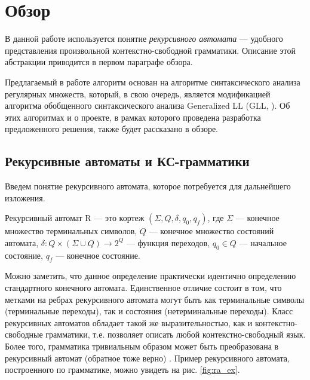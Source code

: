 \section{Обзор}

В данной работе используется понятие \textit{рекурсивного автомата} \cite{tellier2006ra} --- удобного представления произвольной контекстно-свободной грамматики.
Описание этой абстракции приводится в первом параграфе обзора.

Предлагаемый в работе алгоритм основан на алгоритме синтаксического анализа регулярных множеств, который, в свою очередь, является модификацией алгоритма обобщенного синтаксического анализа \linebreak Generalized LL (GLL, \cite{gll}).
Об этих алгоритмах и о проекте, в рамках которого проведена разработка предложенного решения, также будет рассказано в обзоре.

\subsection{Рекурсивные автоматы и КС-грамматики}
Введем понятие рекурсивного автомата, которое потребуется для дальнейшего изложения.

\begin{defn}
	Рекурсивный автомат R --- это кортеж $(\Sigma, Q, \delta, q_0, q_f)$, где $\Sigma$ --- конечное множество терминальных символов, $Q$ --- конечное множество состояний автомата, $\delta : Q \times (\Sigma \cup Q) \rightarrow 2^Q$ --- функция переходов, $q_0 \in Q$ --- начальное состояние, $q_f$ --- конечное состояние. 
\end{defn}

Можно заметить, что данное определение практически идентично определению стандартного конечного автомата. 
Единственное отличие состоит в том, что метками на ребрах рекурсивного автомата могут быть как терминальные символы (терминальные переходы), так и состояния (нетерминальные переходы).
Класс рекурсивных автоматов обладает такой же выразительностью, как и контекстно-свободные грамматики, т.е. позволяет описать любой контекстно-свободный язык. 
Более того, грамматика тривиальным образом может быть преобразована в рекурсивный автомат (обратное тоже верно) \cite{tellier2006ra}. 
Пример рекурсивного автомата, построенного по грамматике, можно увидеть на рис. \ref{fig:ra_ex}.

